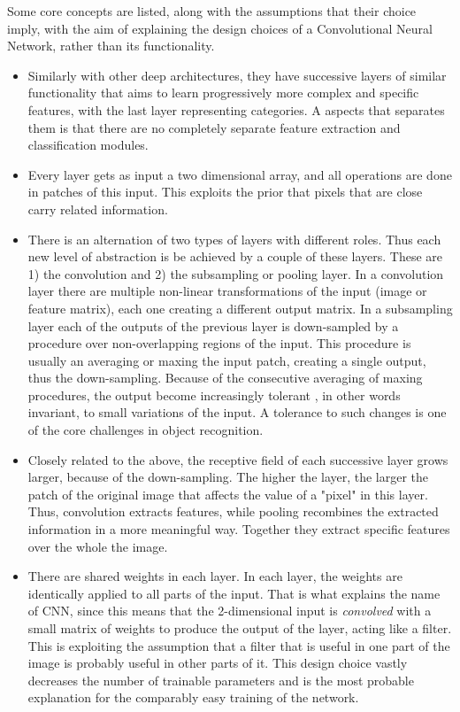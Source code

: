 \documentclass[a4paper]{report}
\begin{document}
			Some core concepts are listed, along with the assumptions that their choice imply, with the aim of explaining the design choices of a Convolutional Neural Network, rather than its functionality.
			\begin{itemize}
				\item Similarly with other deep architectures, they have successive layers of similar functionality that aims to learn progressively more complex and specific features, with the last layer representing categories. A aspects that separates them is that there are no completely separate feature extraction and classification modules.
				\item Every layer gets as input a two dimensional array, and all operations are done in patches of this input. This exploits the prior that pixels that are close carry related information.
				\item There is an alternation of two types of layers with different roles. Thus each new level of abstraction is be achieved by a couple of these layers. These are 1) the convolution and 2) the subsampling or pooling layer. In a convolution layer there are multiple non-linear transformations of the input (image or feature matrix), each one creating a different output matrix. In a subsampling layer each of the outputs of the previous layer is down-sampled  by a procedure over non-overlapping regions of the input. This procedure is usually an averaging or maxing the input patch, creating a single output, thus the down-sampling. Because of the consecutive averaging of maxing procedures, the output become increasingly tolerant , in other words invariant, to small variations of the input. A tolerance to such changes is one of the core challenges in object recognition.
				\item Closely related to the above, the receptive field of each successive layer grows larger, because of the down-sampling. The higher the layer, the larger the patch of the original image that affects the value of a "pixel" in this layer.  Thus, convolution extracts features, while pooling recombines the extracted information in a more meaningful way. Together they extract specific features over the whole the image.
				\item There are shared weights in each layer. In each layer, the weights are identically applied to all parts of the input. That is what explains the name of CNN, since this means that the 2-dimensional input is \textit{convolved} with a small matrix of weights to produce the output of the layer, acting like a filter. This is exploiting the assumption that a filter that is useful in one part of the image is probably useful in other parts of it. This design choice vastly decreases the number of trainable parameters and is the most probable explanation for the comparably easy training of the network.
			\end{itemize}
\end{document}
